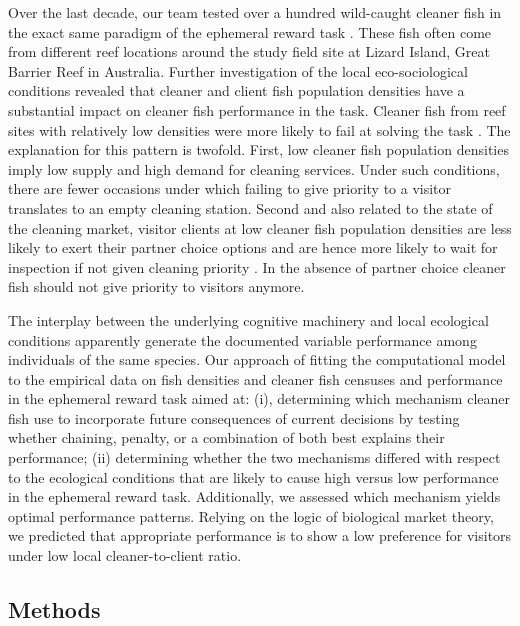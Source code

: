 \documentclass[]{rsos}%
\begin{document}
Over the last decade, our team tested over a hundred wild-caught
cleaner fish in the exact same paradigm of the ephemeral reward
task \citep{salwiczek_Adult_2012, wismer_Variation_2014, triki_Decrease_2018, triki_Biological_2019, triki_Brain_2020}. These fish often come from
different reef locations around the study field site at Lizard Island,
Great Barrier Reef in Australia. Further investigation of the local
eco-sociological conditions revealed that cleaner and client
fish population densities have a substantial impact on cleaner fish
performance in the task. Cleaner fish from reef sites with relatively
low densities were more likely to fail at solving the task \citep{triki_Biological_2019, triki_Decrease_2018, wismer_Variation_2014}. The explanation for this pattern
is twofold. First, low cleaner fish population densities imply
low supply and high demand for cleaning services.
Under such conditions, there are fewer occasions under
which failing to give priority to a visitor translates to an empty
cleaning station. Second and also related to the state of the cleaning market,
visitor clients at low cleaner fish population densities
are less likely to exert their partner choice options
and are hence more likely to wait for inspection if not given cleaning
priority \citep{triki_Brain_2020}. In the absence of partner choice
cleaner fish should not give priority to visitors anymore.

The interplay between the underlying cognitive machinery and
local ecological conditions apparently generate the documented variable
performance among individuals of the same species.
Our approach of fitting the computational model to the empirical data on
fish densities and cleaner fish censuses and performance
in the ephemeral reward task aimed at: (i), determining which
mechanism cleaner fish use to incorporate future consequences of current
decisions by testing whether chaining, penalty, or a combination
of both best explains their performance; (ii) determining whether the
two mechanisms differed with respect to the ecological conditions
that are likely to cause high versus low performance in the
ephemeral reward task. Additionally, we assessed which mechanism
yields optimal performance patterns. Relying on the logic of
biological market theory, we predicted
that appropriate performance is to show a low preference for visitors under low
local cleaner-to-client ratio.

\hypertarget{methods}{%
\subsection{Methods}\label{methods}}
\end{document}
